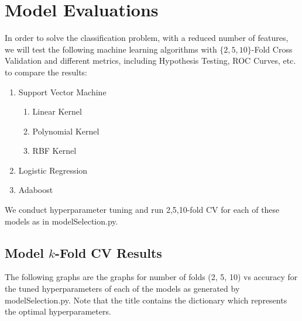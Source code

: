 \documentclass[fleqn]{article}
\begin{document}
    \section{Model Evaluations}
    In order to solve the classification problem, with a reduced number of features,
    we will test the following machine learning algorithms with $ \{2, 5, 10\} $-Fold Cross
    Validation and different metrics, including Hypothesis Testing, ROC Curves, etc.
    to compare the results:
    \begin{enumerate}
        \item Support Vector Machine
        \begin{enumerate}
            \item Linear Kernel
            \item Polynomial Kernel
            \item RBF Kernel
        \end{enumerate}
        \item Logistic Regression
        \item Adaboost
    \end{enumerate}
    We conduct hyperparameter tuning and run 2,5,10-fold CV for each of these models as
    in modelSelection.py.

    \subsection{Model $k$-Fold CV Results}

    The following graphs are the graphs for number of folds (2, 5, 10) vs accuracy for
    the tuned hyperparameters of each of the models as generated by modelSelection.py. Note
    that the title contains the dictionary which represents the optimal hyperparameters.
\end{document}
